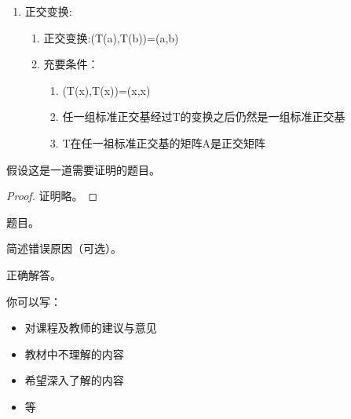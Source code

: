 \documentclass[11pt, a4paper, UTF8]{ctexart}
\begin{document}
\begin{solution}
\begin{enumerate}
\begin{enumerate}
  \end{enumerate}
\item 正交变换:
\begin{enumerate}
  \item 正交变换:(T(a),T(b))=(a,b)
  \item 充要条件：
\begin{enumerate}
  \item (T(x),T(x))=(x,x)
  \item 任一组标准正交基经过T的变换之后仍然是一组标准正交基
  \item T在任一祖标准正交基的矩阵A是正交矩阵
\end{enumerate}
\end{enumerate}
  \end{enumerate}
\end{solution}
\begin{problem}[UD: x.x]
  假设这是一道需要证明的题目。	
\end{problem}


\begin{proof}
  证明略。	
\end{proof}
\begincorrection	%

\begin{problem}[题号]
  题目。
\end{problem}

\begin{cause}
  简述错误原因（可选）。
\end{cause}

\begin{revision}
  正确解答。
\end{revision}
\beginfb	%

你可以写：
\begin{itemize}
  \item 对课程及教师的建议与意见
  \item 教材中不理解的内容
  \item 希望深入了解的内容
  \item 等
\end{itemize}
\end{document}
